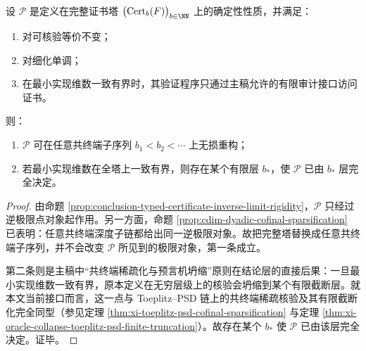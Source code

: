 \begin{theorem}[共终端稀疏化的语义完备性]\label{thm:conclusion-cofinal-sparsification-semantic-completeness}
设 \(\mathcal P\) 是定义在完整证书塔 \(\bigl(\mathrm{Cert}_b(F)\bigr)_{b\in\NN}\) 上的确定性性质，并满足：
\begin{enumerate}
  \item 对可核验等价不变；
  \item 对细化单调；
  \item 在最小实现维数一致有界时，其验证程序只通过主稿允许的有限审计接口访问证书。
\end{enumerate}
则：
\begin{enumerate}
  \item \(\mathcal P\) 可在任意共终端子序列 \(b_1<b_2<\cdots\) 上无损重构；
  \item 若最小实现维数在全塔上一致有界，则存在某个有限层 \(b_\ast\)，使 \(\mathcal P\) 已由 \(b_\ast\) 层完全决定。
\end{enumerate}
\end{theorem}
\begin{proof}
由命题 \ref{prop:conclusion-typed-certificate-inverse-limit-rigidity}，\(\mathcal P\) 只经过逆极限点对象起作用。另一方面，命题 \ref{prop:cdim-dyadic-cofinal-sparsification} 已表明：任意共终端深度子链都给出同一逆极限对象。故把完整塔替换成任意共终端子序列，并不会改变 \(\mathcal P\) 所见到的极限对象，第一条成立。

第二条则是主稿中“共终端稀疏化与预言机坍缩”原则在结论层的直接后果：一旦最小实现维数一致有界，原本定义在无穷层级上的核验会坍缩到某个有限截断层。就本文当前接口而言，这一点与 Toeplitz--PSD 链上的共终端稀疏核验及其有限截断化完全同型（参见定理 \ref{thm:xi-toeplitz-psd-cofinal-sparsification} 与定理 \ref{thm:xi-oracle-collapse-toeplitz-psd-finite-truncation}）。故存在某个 \(b_\ast\) 使 \(\mathcal P\) 已由该层完全决定。证毕。
\end{proof}

